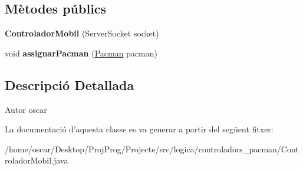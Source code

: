 \subsection*{Mètodes públics}
\begin{DoxyCompactItemize}
\item 
\hypertarget{classlogica_1_1controladors__pacman_1_1_controlador_mobil_ae1e2cc87062728a1c8261c7b3f66483d}{{\bfseries Controlador\+Mobil} (Server\+Socket socket)}\label{classlogica_1_1controladors__pacman_1_1_controlador_mobil_ae1e2cc87062728a1c8261c7b3f66483d}

\item 
\hypertarget{classlogica_1_1controladors__pacman_1_1_controlador_mobil_a9aabffe23f7920ae8482c7e8906c8d0e}{void {\bfseries assignar\+Pacman} (\hyperlink{classlogica_1_1_pacman}{Pacman} pacman)}\label{classlogica_1_1controladors__pacman_1_1_controlador_mobil_a9aabffe23f7920ae8482c7e8906c8d0e}

\end{DoxyCompactItemize}


\subsection{Descripció Detallada}
\begin{DoxyAuthor}{Autor}
oscar 
\end{DoxyAuthor}


La documentació d'aquesta classe es va generar a partir del següent fitxer\+:\begin{DoxyCompactItemize}
\item 
/home/oscar/\+Desktop/\+Proj\+Prog/\+Projecte/src/logica/controladors\+\_\+pacman/Controlador\+Mobil.\+java\end{DoxyCompactItemize}
